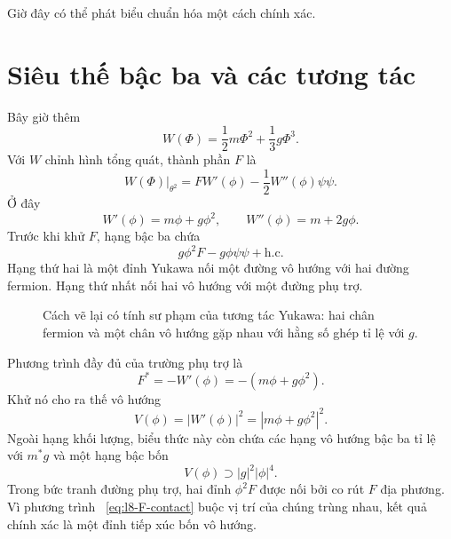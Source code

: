Giờ đây có thể phát biểu chuẩn hóa một cách chính xác.

\section{Siêu thế bậc ba và các tương tác}

Bây giờ thêm
\begin{equation}
W(\Phi)=\frac12m\Phi^2+\frac13g\Phi^3.
\label{eq:l8-superpotential}
\end{equation}
Với \(W\) chỉnh hình tổng quát, thành phần \(F\) là
\begin{equation}
\left.W(\Phi)\right|_{\theta^2}
=F W'(\phi)-\frac12W''(\phi)\psi\psi.
\label{eq:l8-W-components}
\end{equation}
Ở đây
\begin{equation}
W'(\phi)=m\phi+g\phi^2,
\qquad
W''(\phi)=m+2g\phi.
\end{equation}
Trước khi khử \(F\), hạng bậc ba chứa
\begin{equation}
g\phi^2F-g\phi\psi\psi+\text{h.c.}
\label{eq:l8-cubic-offshell}
\end{equation}
Hạng thứ hai là một đỉnh Yukawa nối một đường vô hướng với hai đường fermion. Hạng thứ nhất nối hai vô hướng với một đường phụ trợ.

\begin{figure}[H]
\centering
{}
\caption{Cách vẽ lại có tính sư phạm của tương tác Yukawa: hai chân fermion và một chân vô hướng gặp nhau với hằng số ghép tỉ lệ với \(g\).}
\end{figure}

Phương trình đầy đủ của trường phụ trợ là
\begin{equation}
F^\ast=-W'(\phi)=-(m\phi+g\phi^2).
\label{eq:l8-general-F-equation}
\end{equation}
Khử nó cho ra thế vô hướng
\begin{equation}
V(\phi)=|W'(\phi)|^2
=|m\phi+g\phi^2|^2.
\label{eq:l8-scalar-potential}
\end{equation}
Ngoài hạng khối lượng, biểu thức này còn chứa các hạng vô hướng bậc ba tỉ lệ với \(m^\ast g\) và một hạng bậc bốn
\begin{equation}
V(\phi)\supset |g|^2|\phi|^4.
\label{eq:l8-quartic}
\end{equation}
Trong bức tranh đường phụ trợ, hai đỉnh \(\phi^2F\) được nối bởi co rút \(F\) địa phương. Vì phương trình ~\eqref{eq:l8-F-contact} buộc vị trí của chúng trùng nhau, kết quả chính xác là một đỉnh tiếp xúc bốn vô hướng.

